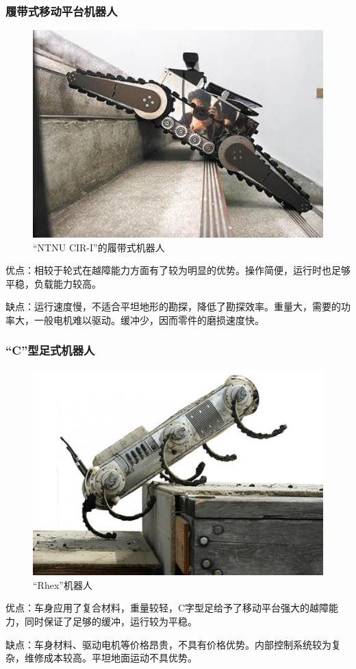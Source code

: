 \documentclass[12pt]{article}
\begin{document}
\begin{CJK}{UTF8}{gbsn}
\subsubsection{履带式移动平台机器人}
\begin{figure}[H]
\centering
\includegraphics[width=.8\textwidth]{chap1//fig3.jpg}
\caption{“NTNU CIR-I”的履带式机器人}
\end{figure}
优点：相较于轮式在越障能力方面有了较为明显的优势。操作简便，运行时也足够平稳，负载能力较高。\par
缺点：运行速度慢，不适合平坦地形的勘探，降低了勘探效率。重量大，需要的功率大，一般电机难以驱动。缓冲少，因而零件的磨损速度快。

\subsubsection{“C”型足式机器人}
\begin{figure}[H]
\centering
\includegraphics[width=.8\textwidth]{chap1//fig4.jpg}
\caption{“Rhex”机器人}
\end{figure}
优点：车身应用了复合材料，重量较轻，C字型足给予了移动平台强大的越障能力，同时保证了足够的缓冲，运行较为平稳。\par
缺点：车身材料、驱动电机等价格昂贵，不具有价格优势。内部控制系统较为复杂，维修成本较高。平坦地面运动不具优势。


\end{CJK}
\end{document}
